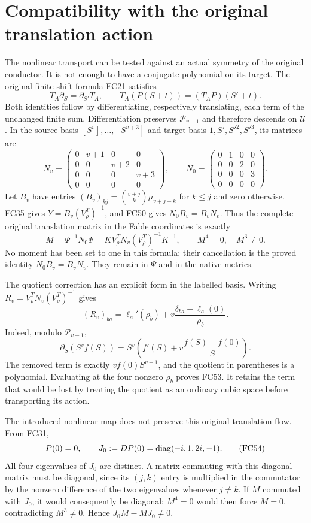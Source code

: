 \section{Compatibility with the original translation action}
The nonlinear transport can be tested against an actual symmetry of the
original conductor. It is not enough to have a conjugate polynomial
on its target. The original finite-shift formula FC21 satisfies
\[
 T_A\partial_S=\partial_{S'}T_A,\qquad
 T_A(P(S+t))=(T_AP)(S'+t).
 \tag{FC50}
\]
Both identities follow by differentiating, respectively translating,
each term of the unchanged finite sum. Differentiation preserves
$\mathcal P_{v-1}$ and therefore descends on $\mathcal U$.
In the source basis $[S^v],\ldots,[S^{v+3}]$ and target basis
$1,S',S'^2,S'^3$, its matrices are
\[
 N_v=\begin{pmatrix}0&v+1&0&0\\0&0&v+2&0\\0&0&0&v+3\\0&0&0&0\end{pmatrix},
 \qquad
 N_0=\begin{pmatrix}0&1&0&0\\0&0&2&0\\0&0&0&3\\0&0&0&0\end{pmatrix}.
 \tag{FC51}
\]
Let $B_v$ have entries
$(B_v)_{kj}=\binom{v+j}{k}\mu_{v+j-k}$ for $k\le j$ and zero
otherwise. FC35 gives $Y=B_v(V_\rho^T)^{-1}$, and FC50 gives
$N_0B_v=B_vN_v$. Thus the complete original translation matrix
in the Fable coordinates is exactly
\[
 M=\Psi^{-1}N_0\Psi
   =K V_\rho^T N_v(V_\rho^T)^{-1}K^{-1},\qquad M^4=0,
 \quad M^3\ne0.
 \tag{FC52}
\]
No moment has been set to one in this formula: their cancellation is
the proved identity $N_0B_v=B_vN_v$. They remain in $\Psi$ and in
the native metrics.

The quotient correction has an explicit form in the labelled basis.
Writing $R_v=V_\rho^T N_v(V_\rho^T)^{-1}$ gives
\[
 (R_v)_{ba}=\ell_a'(\rho_b)
          +v\frac{\delta_{ba}-\ell_a(0)}{\rho_b}.
 \tag{FC53}
\]
Indeed, modulo $\mathcal P_{v-1}$,
\[
 \partial_S(S^vf(S))
 =S^v\left(f'(S)+v\frac{f(S)-f(0)}S\right).
\]
The removed term is exactly $vf(0)S^{v-1}$, and the quotient in
parentheses is a polynomial. Evaluating at the four nonzero $\rho_b$
proves FC53. It retains the term that would be lost by treating the
quotient as an ordinary cubic space before transporting its action.

The introduced nonlinear map does not preserve this original
translation flow. From FC31,
\[
 P(0)=0,\qquad J_0:=DP(0)=\operatorname{diag}(-i,1,2i,-1).
 \tag{FC54}
\]
All four eigenvalues of $J_0$ are distinct. A matrix commuting with
this diagonal matrix must be diagonal, since its $(j,k)$ entry is
multiplied in the commutator by the nonzero difference of the two
eigenvalues whenever $j\ne k$. If $M$ commuted with $J_0$, it
would consequently be diagonal; $M^4=0$ would then force $M=0$,
contradicting $M^3\ne0$. Hence $J_0M-MJ_0\ne0$.

